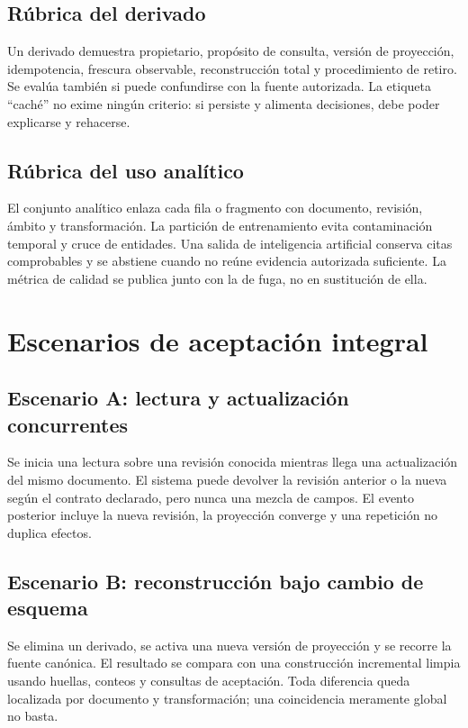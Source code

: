 \section{Rúbrica del derivado}

Un derivado demuestra propietario, propósito de consulta, versión de proyección,
idempotencia, frescura observable, reconstrucción total y procedimiento de retiro. Se
evalúa también si puede confundirse con la fuente autorizada. La etiqueta ``caché'' no
exime ningún criterio: si persiste y alimenta decisiones, debe poder explicarse y rehacerse.

\section{Rúbrica del uso analítico}

El conjunto analítico enlaza cada fila o fragmento con documento, revisión, ámbito y
transformación. La partición de entrenamiento evita contaminación temporal y cruce de
entidades. Una salida de inteligencia artificial conserva citas comprobables y se
abstiene cuando no reúne evidencia autorizada suficiente. La métrica de calidad se
publica junto con la de fuga, no en sustitución de ella.

\chapter{Escenarios de aceptación integral}

\section{Escenario A: lectura y actualización concurrentes}

Se inicia una lectura sobre una revisión conocida mientras llega una actualización del
mismo documento. El sistema puede devolver la revisión anterior o la nueva según el
contrato declarado, pero nunca una mezcla de campos. El evento posterior incluye la
nueva revisión, la proyección converge y una repetición no duplica efectos.

\section{Escenario B: reconstrucción bajo cambio de esquema}

Se elimina un derivado, se activa una nueva versión de proyección y se recorre la fuente
canónica. El resultado se compara con una construcción incremental limpia usando huellas,
conteos y consultas de aceptación. Toda diferencia queda localizada por documento y
transformación; una coincidencia meramente global no basta.

